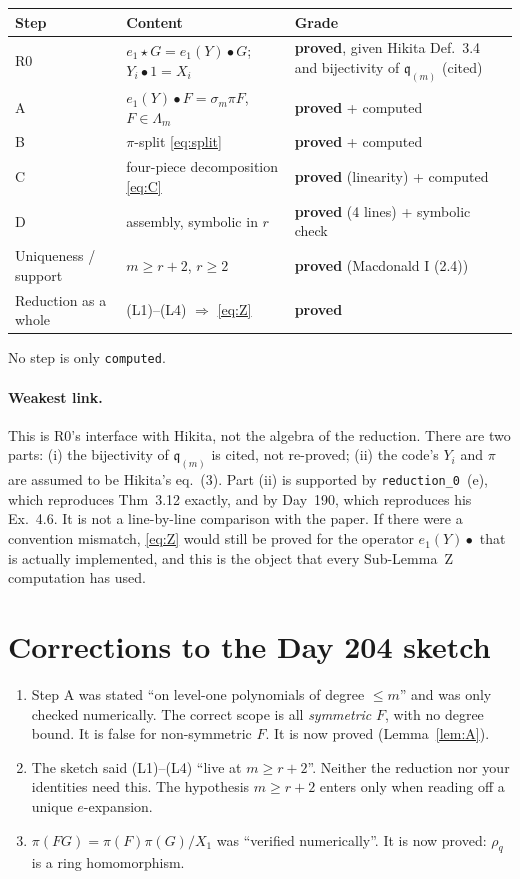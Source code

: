 \documentclass[11pt]{article}
\newcommand{\bul}{\bullet}
\theoremstyle{definition}
\begin{document}
\begin{center}\small
\begin{tabular}{@{}p{}p{}p{}@{}}\toprule
Step & Content & Grade\\\midrule
R0 & $e_1\star G=e_1(Y)\bul G$; $Y_i\bul1=X_i$ & \textbf{proved}, given Hikita Def.~3.4 and bijectivity of $\mathfrak q_{(m)}$ (cited)\\
A & $e_1(Y)\bul F=\sigma_m\pi F$, $F\in\Lambda_m$ & \textbf{proved} + computed\\
B & $\pi$-split \eqref{eq:split} & \textbf{proved} + computed\\
C & four-piece decomposition \eqref{eq:C} & \textbf{proved} (linearity) + computed\\
D & assembly, symbolic in $r$ & \textbf{proved} (4 lines) + symbolic check\\
Uniqueness / support & $m\ge r+2$, $r\ge2$ & \textbf{proved} (Macdonald I (2.4))\\
Reduction as a whole & (L1)--(L4) $\Rightarrow$ \eqref{eq:Z} & \textbf{proved}\\\bottomrule
\end{tabular}
\end{center}
No step is only \texttt{computed}.

\paragraph{Weakest link.} This is R0's interface with Hikita, not the algebra of the reduction. There are
two parts: (i) the bijectivity of $\mathfrak q_{(m)}$ is cited, not re-proved; (ii) the code's $Y_i$ and
$\pi$ are assumed to be Hikita's eq.~(3). Part (ii) is supported by \texttt{reduction\_0}~(e), which
reproduces Thm~3.12 exactly, and by Day~190, which reproduces his Ex.~4.6. It is not a
line-by-line comparison with the paper. If there were a convention mismatch,
\eqref{eq:Z} would still be proved for the operator $e_1(Y)\bul$ that is actually
implemented, and this is the object that every Sub-Lemma~Z computation has used.

\section{Corrections to the Day 204 sketch}
\begin{enumerate}
\item Step A was stated ``on level-one polynomials of degree $\le m$'' and was only checked
numerically. The correct scope is all \emph{symmetric} $F$, with no degree bound. It is false for
non-symmetric $F$. It is now proved (Lemma~\ref{lem:A}).
\item The sketch said (L1)--(L4) ``live at $m\ge r+2$''. Neither the reduction nor your
identities need this. The hypothesis $m\ge r+2$ enters only when reading off a unique
$e$-expansion.
\item $\pi(FG)=\pi(F)\pi(G)/X_1$ was ``verified numerically''. It is now proved:
$\rho_q$ is a ring homomorphism.
\end{enumerate}
\end{document}
